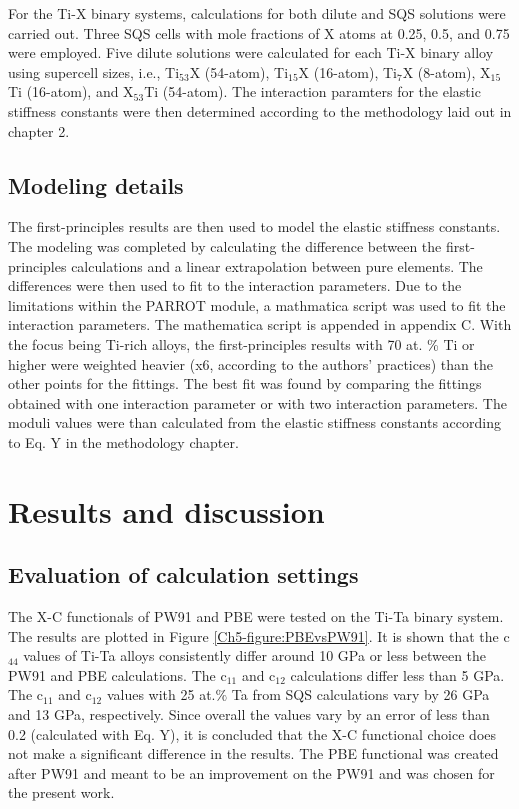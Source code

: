 For the Ti-X binary systems, calculations for both dilute and SQS solutions were carried out. Three SQS cells with mole fractions of X atoms at 0.25, 0.5, and 0.75 were employed. Five dilute solutions were calculated for each Ti-X binary alloy using supercell sizes, i.e., Ti$_{53}$X (54-atom), Ti$_{15}$X (16-atom), Ti$_{7}$X (8-atom), X$_{15}$Ti (16-atom), and X$_{53}$Ti (54-atom). The interaction paramters for the  elastic stiffness constants were then determined according to the methodology laid out in chapter 2. 

\subsection{Modeling details}

  The first-principles results are then used to model the elastic stiffness constants. The modeling was completed by calculating the difference between the first-principles calculations and a linear extrapolation between pure elements. The differences were then used to fit to the interaction parameters. Due to the limitations within the PARROT module, a mathmatica script was used to fit the interaction parameters. The mathematica script is appended in appendix C. With the focus being Ti-rich alloys, the first-principles results with 70 at. \% Ti or higher were weighted heavier (x6, according to the authors' practices) than the other points for the fittings. The best fit was found by comparing the fittings obtained with one interaction parameter or with two interaction parameters. The moduli values were than calculated from the elastic stiffness constants according to Eq. Y in the methodology chapter.

\section{Results and discussion}

\subsection{Evaluation of calculation settings}

The X-C functionals of PW91 and PBE were tested on the Ti-Ta binary system. The results are plotted in Figure \ref{Ch5-figure:PBEvsPW91}. It is shown that the c$_{44}$ values of Ti-Ta alloys consistently differ around 10 GPa or less between the PW91 and PBE calculations. The c$_{11}$ and c$_{12}$ calculations differ less than 5 GPa. The c$_{11}$ and c$_{12}$ values with 25 at.$\%$ Ta from SQS calculations vary by 26 GPa and 13 GPa, respectively. Since overall the values vary by an error of less than 0.2 (calculated with Eq. Y), it is concluded that the X-C functional choice does not make a significant difference in the results. The PBE functional was created after PW91 and meant to be an improvement on the PW91 and was chosen for the present work. 

